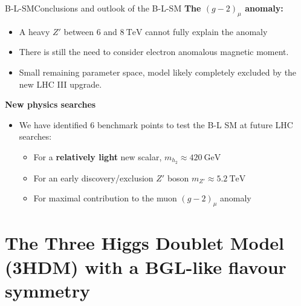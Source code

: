 \documentclass[10pt,xcolor=dvipsnames,mathserif]{beamer}
\newcommand{\g}[2]{g_{_\mathrm{#1}}^{#2}}
\newcommand{\purple}[0]{\color{purple}}
\begin{document}
\begin{frame}{B-L-SM}{Conclusions and outlook of the B-L-SM}
	\textbf{\purple The $\left(g-2\right)_\mu$ anomaly:}
\begin{itemize}
	\item A heavy $Z'$ between $6$ and $8~\mathrm{TeV}$ cannot fully explain the anomaly
	\item There is still the need to consider electron anomalous magnetic moment.
	\item Small remaining parameter space, model likely completely excluded by the new LHC III upgrade. 
\end{itemize}
\vskip2mm
	\textbf{\purple New physics searches}
\begin{itemize}
	\item We have identified 6 benchmark points to test the B-L SM at future LHC searches:
	\vskip2mm
	\begin{itemize}
		\item For a \textbf{relatively light} new scalar, $m_{h_2} \approx 420~\mathrm{GeV}$
		\vskip1mm
		\item For an early discovery/exclusion $Z'$ boson $m_{Z'} \approx 5.2~\mathrm{TeV}$
		\vskip1mm
		\item For maximal contribution to the muon $\left(g-2\right)_\mu$ anomaly
	\end{itemize} 
\end{itemize}
\end{frame}


\section{The Three Higgs Doublet Model (3HDM) with a BGL-like flavour symmetry}
\end{document}

